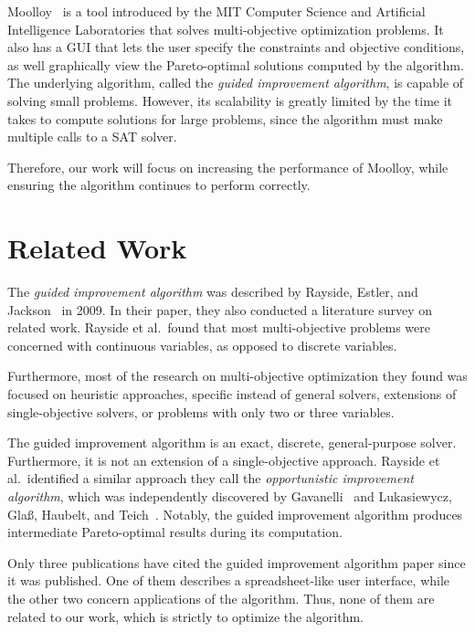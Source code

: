 \documentclass[11pt]{article}
\begin{document}
Moolloy~\cite{ref:Rayside09} is a tool introduced by the MIT Computer
Science and Artificial Intelligence Laboratories that solves
multi-objective optimization problems. It also has a GUI that lets the
user specify the constraints and objective conditions, as well
graphically view the Pareto-optimal solutions computed by the
algorithm. The underlying algorithm, called the \textit{guided
improvement algorithm}, is capable of solving small problems. However,
its scalability is greatly limited by the time it takes to compute
solutions for large problems, since the algorithm must make multiple
calls to a SAT solver.

Therefore, our work will focus on increasing the performance of
Moolloy, while ensuring the algorithm continues to perform correctly.

\section{Related Work}

The \textit{guided improvement algorithm} was described by Rayside,
Estler, and Jackson~\cite{ref:Rayside09} in 2009. In their paper, they
also conducted a literature survey on related work. Rayside et al.\
found that most multi-objective problems were concerned with continuous
variables, as opposed to discrete variables.

Furthermore, most of the research on multi-objective optimization they
found was focused on heuristic approaches, specific instead of general
solvers, extensions of single-objective solvers, or problems with only
two or three variables.

The guided improvement algorithm is an exact, discrete, general-purpose
solver. Furthermore, it is not an extension of a single-objective
approach. Rayside et al.\ identified a similar approach they call the
\textit{opportunistic improvement algorithm}, which was independently
discovered by Gavanelli~\cite{ref:Gavanelli02} and Lukasiewycz, Gla\ss,
Haubelt, and Teich~\cite{ref:Lukas07}. Notably, the guided improvement
algorithm produces intermediate Pareto-optimal results during its
computation.

Only three publications have cited the guided improvement algorithm
paper since it was published. One of them describes a spreadsheet-like
user interface, while the other two concern applications of the
algorithm. Thus, none of them are related to our work, which is
strictly to optimize the algorithm.
\end{document}
